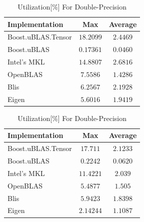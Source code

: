 \begin{table}[ht]
    \centering
    \caption{Utilization[\%] For Single-Precision}
    \begin{tabular}{|l|c|c|}
        \hline
        \textbf{Implementation} & \textbf{Max} & \textbf{Average}\\
        \hline
        Boost.uBLAS.Tensor  & $18.2099$& $2.4469$ \\
        \hline
        Boost.uBLAS         & $0.17361$& $0.0460$ \\
        \hline
        Intel's MKL         & $14.8807$& $2.6816$ \\
        \hline
        OpenBLAS            & $7.5586$& $1.4286$ \\
        \hline
        Blis                & $6.2567$& $2.1928$ \\
        \hline
        Eigen               & $5.6016$& $1.9419$ \\
        \hline
    \end{tabular}

    \vspace*{1 cm}

    \centering
    \caption{Utilization[\%] For Double-Precision}
    \begin{tabular}{|l|c|c|}
        \hline
        \textbf{Implementation} & \textbf{Max} & \textbf{Average}\\
        \hline
        Boost.uBLAS.Tensor  & $17.711$ & $2.1233$ \\
        \hline
        Boost.uBLAS         & $0.2242$ & $0.0620$ \\
        \hline
        Intel's MKL         & $11.4221$ & $2.039$ \\
        \hline
        OpenBLAS            & $5.4877$ & $1.505$ \\
        \hline
        Blis                & $5.9423$ & $1.8398$ \\
        \hline
        Eigen               & $2.14244$ & $1.1087$ \\
        \hline
    \end{tabular}
\end{table}

